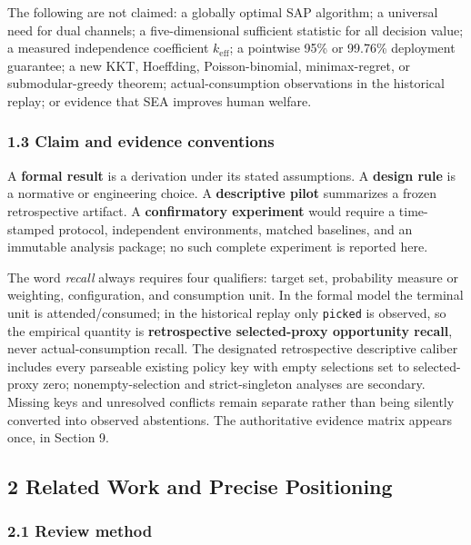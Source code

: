 \documentclass[
  11pt]{article}
\begin{document}
The following are not claimed: a globally optimal SAP algorithm; a
universal need for dual channels; a five-dimensional sufficient
statistic for all decision value; a measured independence coefficient
\(k_{\mathrm{eff}}\); a pointwise 95\% or 99.76\% deployment guarantee;
a new KKT, Hoeffding, Poisson-binomial, minimax-regret, or
submodular-greedy theorem; actual-consumption observations in the
historical replay; or evidence that SEA improves human welfare.

\subsubsection{1.3 Claim and evidence
conventions}\label{claim-and-evidence-conventions}

A \textbf{formal result} is a derivation under its stated assumptions. A
\textbf{design rule} is a normative or engineering choice. A
\textbf{descriptive pilot} summarizes a frozen retrospective artifact. A
\textbf{confirmatory experiment} would require a time-stamped protocol,
independent environments, matched baselines, and an immutable analysis
package; no such complete experiment is reported here.

The word \emph{recall} always requires four qualifiers: target set,
probability measure or weighting, configuration, and consumption unit.
In the formal model the terminal unit is attended/consumed; in the
historical replay only \texttt{picked} is observed, so the empirical
quantity is \textbf{retrospective selected-proxy opportunity recall},
never actual-consumption recall. The designated retrospective
descriptive caliber includes every parseable existing policy key with
empty selections set to selected-proxy zero; nonempty-selection and
strict-singleton analyses are secondary. Missing keys and unresolved
conflicts remain separate rather than being silently converted into
observed abstentions. The authoritative evidence matrix appears once, in
Section 9.

\subsection{2 Related Work and Precise
Positioning}\label{related-work-and-precise-positioning}

\subsubsection{2.1 Review method}\label{review-method}
\end{document}
